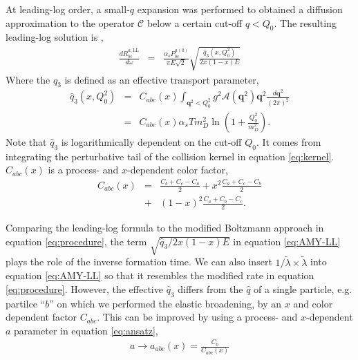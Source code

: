 \documentclass[aps, prc, reprint, amsmath, groupedaddress, nofootinbib]{revtex4-1}
\begin{document}
At leading-log order, a small-$q$ expansion was performed to obtained a diffusion approximation to the operator $\mathcal{C}$ below a certain cut-off $q<Q_0$.
The resulting leading-log solution is \cite{Arnold:2008zu},
\begin{eqnarray}\label{eq:AMY-LL}
\frac{dR_{bc}^{a,\textrm{LL}}}{d\omega} &=& \frac{\alpha_s P_{bc}^{a(0)}}{\pi E\sqrt{2}}
\sqrt{\frac{\hat{q}_3(x, Q_0^2)}{2x(1-x)E}}
\end{eqnarray}
Where the $\hat{q}_3$ is defined as an effective transport parameter,
\begin{eqnarray}
\hat{q}_3(x, Q_0^2) &=& C_{abc}(x) \int_{\mathbf{q}^2 < Q_0^2} g^2\mathcal{A}(\mathbf{q}^2) \mathbf{q}^2 \frac{d\mathbf{q}^2}{(2\pi)^2} \\
&=& C_{abc}(x) \alpha_s T m_D^2 \ln\left(1+\frac{Q_0^2}{m_D^2}\right).\label{eq:qhat3}
\end{eqnarray}
Note that $\hat{q}_3$ is logarithmically dependent on the cut-off $Q_0$.
It comes from integrating the perturbative tail of the collision kernel in equation \ref{eq:kernel}.
$C_{abc}(x)$ is a process- and $x$-dependent color factor,
\begin{eqnarray}
C_{abc}(x) &=&  \frac{C_b+C_c-C_a}{2} + x^2 \frac{C_a+C_c-C_b}{2} \\\nonumber
&+& (1-x)^2\frac{C_a+C_b-C_c}{2}.
\end{eqnarray}

Comparing the leading-log formula to the modified Boltzmann approach in equation \ref{eq:procedure}, the term $\sqrt{\hat{q}_3 / 2x(1-x)E}$ in equation \ref{eq:AMY-LL} plays the role of the inverse formation time.
We can also insert $1/\tilde{\lambda} \times \tilde{\lambda}$ into equation \ref{eq:AMY-LL} so that it resembles the modified rate in equation \ref{eq:procedure}.
However, the effective $\hat{q}_3$ differs from the $\hat{q}$ of a single particle, e.g. partilce ``$b$'' on which we performed the elastic broadening, by an $x$ and color dependent factor $C_{abc}$.
This can be improved by using a process- and $x$-dependent $a$ parameter in equation \ref{eq:ansatz},
\begin{eqnarray}
a \rightarrow a_{abc}(x) = \frac{C_b}{C_{abc}(x)}
\end{eqnarray}
\end{document}

